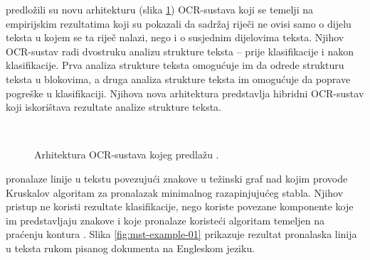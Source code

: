 \documentclass[times, utf8, zavrsni]{fer}
\begin{document}
\citep{zhu2016novel} predložili su novu arhitekturu (slika \ref{fig:novel-ocr})
OCR-sustava koji se temelji na empirijskim rezultatima koji su pokazali da
sadržaj riječi ne ovisi samo o dijelu teksta u kojem se ta riječ nalazi, nego i
o susjednim dijelovima teksta. Njihov OCR-sustav radi dvostruku analizu
strukture teksta -- prije klasifikacije i nakon klasifikacije. Prva analiza
strukture teksta omogućuje im da odrede strukturu teksta u blokovima, a druga
analiza strukture teksta im omogućuje da poprave pogreške u klasifikaciji.
Njihova nova arhitektura predstavlja hibridni OCR-sustav koji iskorištava
rezultate analize strukture teksta.

\

\begin{figure}[htb]
    \centering
    \captionsetup{justification=centering}
    \caption{Arhitektura OCR-sustava kojeg predlažu \citep{zhu2016novel}.}
    \label{fig:novel-ocr}
\end{figure}

\pagebreak

\citep{yin2007handwritten} pronalaze linije u tekstu povezujući znakove u
težinski graf nad kojim provode Kruskalov algoritam za pronalazak minimalnog
razapinjujućeg stabla. Njihov pristup ne koristi rezultate klasifikacije, nego
koriste povezane komponente koje im predstavljaju znakove i koje pronalaze
koristeći algoritam temeljen na praćenju kontura . Slika
\ref{fig:mst-example-01} prikazuje rezultat pronalaska linija u teksta rukom
pisanog dokumenta na Engleskom jeziku.

\
\end{document}
